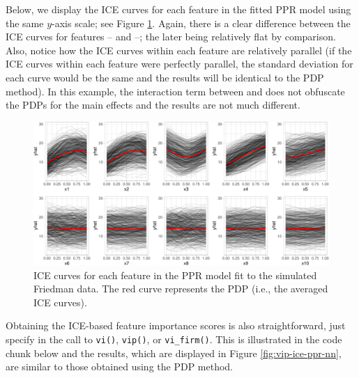 Below, we display the ICE curves for each feature in the fitted PPR
model using the same \(y\)-axis scale; see Figure \ref{fig:ice-ppr}.
Again, there is a clear difference between the ICE curves for features
-- and --; the later being
relatively flat by comparison. Also, notice how the ICE curves within
each feature are relatively parallel (if the ICE curves within each
feature were perfectly parallel, the standard deviation for each curve
would be the same and the results will be identical to the PDP method).
In this example, the interaction term between  and 
does not obfuscate the PDPs for the main effects and the results are not
much different.

\begin{Schunk}
\begin{figure}[!htb]

{\centering \includegraphics[width=1\linewidth]{greenwell-boehmke_files/figure-latex/ice-ppr-1} 

}

\caption[ICE curves for each feature in the PPR model fit to the simulated Friedman data]{ICE curves for each feature in the PPR model fit to the simulated Friedman data. The red curve represents the PDP (i.e., the averaged ICE curves).}\label{fig:ice-ppr}
\end{figure}
\end{Schunk}

Obtaining the ICE-based feature importance scores is also
straightforward, just specify  in the call to
\texttt{vi()}, \texttt{vip()}, or \texttt{vi\_firm()}. This is
illustrated in the code chunk below and the results, which are displayed
in Figure \ref{fig:vip-ice-ppr-nn}, are similar to those obtained using
the PDP method.

